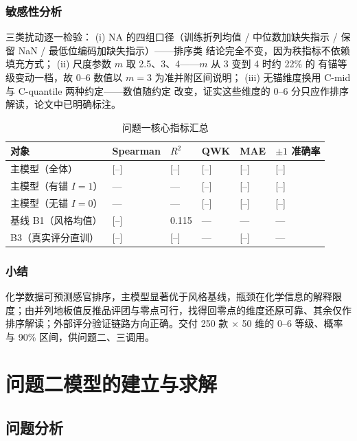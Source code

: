 \documentclass[12pt,a4paper]{article}
\begin{document}
\subsubsection{敏感性分析}

三类扰动逐一检验：
(i) NA 的四组口径（训练折列均值 / 中位数加缺失指示 / 保留 NaN /
最低位编码加缺失指示）——排序类
结论完全不变，因为秩指标不依赖填充方式；
(ii) 尺度参数 $m$ 取 2.5、3、4——$m$ 从 3 变到 4 时约 22\% 的
有锚等级变动一档，故 0--6 数值以 $m=3$ 为准并附区间说明；
(iii) 无锚维度换用 C-mid 与 C-quantile 两种约定——数值随约定
改变，证实这些维度的 0--6 分只应作排序解读，论文中已明确标注。

\begin{table}[H]
  \centering\small
  \caption{问题一核心指标汇总}
  \label{tab:q1_summary}
  \begin{tabularx}{\textwidth}{lYYYYY}
    \toprule
    对象 & Spearman & $R^2$ & QWK & MAE & $\pm1$ 准确率 \\
    \midrule
    主模型（全体） & [--] & [--] & [--] & [--] & [--] \\
    主模型（有锚 $I{=}1$） & --- & --- & [--] & [--] & [--] \\
    主模型（无锚 $I{=}0$） & --- & --- & [--] & [--] & [--] \\
    基线 B1（风格均值） & [--] & 0.115 & --- & --- & --- \\
    B3（真实评分直训） & [--] & [--] & --- & [--] & --- \\
    \bottomrule
  \end{tabularx}
\end{table}

\subsubsection*{小结}

化学数据可预测感官排序，主模型显著优于风格基线，瓶颈在化学信息的解释限度；由并列地板值反推品评团与零点可行，找得回零点的维度还原可靠、其余仅作排序解读；外部评分验证链路方向正确。交付 250 款 $\times$ 50 维的 0--6 等级、概率与 90\% 区间，供问题二、三调用。


\section{问题二模型的建立与求解}

\subsection{问题分析}
\end{document}
